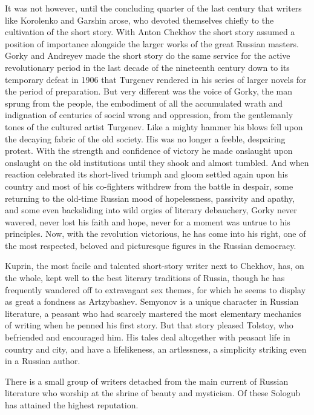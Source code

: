 It was not however, until the concluding quarter of the last century
that writers like Korolenko and Garshin arose, who devoted themselves
chiefly to the cultivation of the short story. With Anton Chekhov the
short story assumed a position of importance alongside the larger
works of the great Russian masters. Gorky and Andreyev made the short
story do the same service for the active revolutionary period in the
last decade of the nineteenth century down to its temporary defeat in
1906 that Turgenev rendered in his series of larger novels for the
period of preparation. But very different was the voice of Gorky, the
man sprung from the people, the embodiment of all the accumulated
wrath and indignation of centuries of social wrong and oppression,
from the gentlemanly tones of the cultured artist Turgenev. Like a
mighty hammer his blows fell upon the decaying fabric of the old
society. His was no longer a feeble, despairing protest. With the
strength and confidence of victory he made onslaught upon onslaught on
the old institutions until they shook and almost tumbled. And when
reaction celebrated its short-lived triumph and gloom settled again
upon his country and most of his co-fighters withdrew from the battle
in despair, some returning to the old-time Russian mood of
hopelessness, passivity and apathy, and some even backsliding into
wild orgies of literary debauchery, Gorky never wavered, never lost
his faith and hope, never for a moment was untrue to his principles.
Now, with the revolution victorious, he has come into his right, one
of the most respected, beloved and picturesque figures in the Russian
democracy.

Kuprin, the most facile and talented short-story writer next to
Chekhov, has, on the whole, kept well to the best literary traditions
of Russia, though he has frequently wandered off to extravagant sex
themes, for which he seems to display as great a fondness as
Artzybashev. Semyonov is a unique character in Russian literature, a
peasant who had scarcely mastered the most elementary mechanics of
writing when he penned his first story. But that story pleased
Tolstoy, who befriended and encouraged him. His tales deal altogether
with peasant life in country and city, and have a lifelikeness, an
artlessness, a simplicity striking even in a Russian author.

There is a small group of writers detached from the main current of
Russian literature who worship at the shrine of beauty and mysticism.
Of these Sologub has attained the highest reputation.


